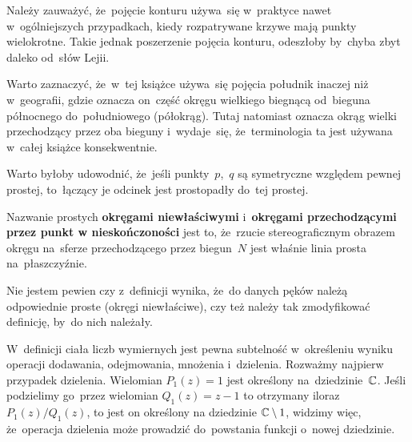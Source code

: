 \documentclass[a4paper,11pt]{article}
\numberwithin{equation}{section}
\begin{document}
Należy zauważyć, że~pojęcie konturu używa~się w~praktyce nawet
w~ogólniejszych przypadkach, kiedy rozpatrywane krzywe mają punkty
wielokrotne. Takie jednak poszerzenie pojęcia konturu, odeszłoby
by~chyba zbyt daleko od~słów Lejii.

\VerSpaceFour





\noindent
{} Warto zaznaczyć, że~w~tej książce używa~się pojęcia
południk inaczej niż w~geografii, gdzie oznacza on~część okręgu
wielkiego biegnącą od~bieguna północnego do~południowego (półokrąg).
Tutaj natomiast oznacza okrąg wielki przechodzący przez oba bieguny
i~wydaje~się, że~terminologia ta jest używana w~całej książce
konsekwentnie.

\VerSpaceFour





\noindent
{} Warto byłoby udowodnić, że~jeśli punkty~$p$,~$q$ są symetryczne
względem pewnej prostej, to~łączący je odcinek jest prostopadły do~tej
prostej.

\VerSpaceFour





\noindent
{} Nazwanie prostych \textbf{okręgami niewłaściwymi}
i~\textbf{okręgami przechodzącymi przez punkt w nieskończoności} jest
to, że~rzucie stereograficznym obrazem okręgu na~sferze przechodzącego
przez biegun~$N$ jest właśnie linia prosta na~płaszczyźnie.

\VerSpaceFour





\noindent
{} Nie jestem pewien czy z~definicji wynika, że~do danych pęków
należą odpowiednie proste (okręgi niewłaściwe), czy też należy tak
zmodyfikować definicję, by~do nich należały.

\VerSpaceFour





\noindent
{} W~definicji ciała liczb wymiernych jest pewna subtelność
w~określeniu wyniku operacji dodawania, odejmowania, mnożenia i~dzielenia.
Rozważmy najpierw przypadek dzielenia. Wielomian $P_{ 1 }( z ) = 1$ jest
określony na~dziedzinie~$\mathbb{C}$. Jeśli podzielimy go~przez wielomian
$Q_{ 1 }( z ) = z - 1$ to otrzymany iloraz $P_{ 1 }( z ) / Q_{ 1 }( z )$,
to jest on określony na dziedzinie $\mathbb{C} \setminus 1$, widzimy więc, że~operacja
dzielenia może prowadzić do~powstania funkcji o~nowej dziedzinie.
\end{document}
